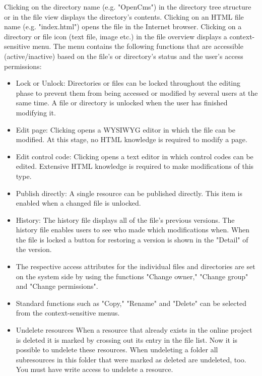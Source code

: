 Clicking on the directory name (e.g. "OpenCms") in the directory
tree structure or in the file view displays the directory's
contents. Clicking on an HTML file name (e.g. "index.html") opens
the file in the Internet browser. Clicking on a directory or file
icon (text file, image etc.) in the file overview displays a
context-sensitive menu. The menu contains the following functions
that are accessible (active/inactive) based on the file's or
directory's status and the user's access permissions:

\begin{itemize}
\item Lock or Unlock: Directories or files can be locked throughout
the editing phase to prevent them from being accessed or modified
by several users at the same time. A file or directory is unlocked
when the user has finished modifying it.

\item Edit page: Clicking opens a WYSIWYG editor in which the file can be modified.
At this stage, no HTML knowledge is required to modify a page.

\item Edit control code: Clicking opens a text editor in which
control codes can be edited. Extensive HTML knowledge is required
to make modifications of this type.

\item Publish directly: A single resource can be published
directly. This item is enabled when a changed file is unlocked.

\item History: The history file displays all of the file's previous
versions. The history file enables users to see who made which
modifications when. When the file is locked a button for restoring
a version is shown in the "Detail" of the version.

\item The respective access
attributes for the individual files and directories are set on the
system side by using the functions "Change owner," "Change group"
and "Change permissions".

\item Standard functions such as "Copy,"
"Rename" and "Delete" can be selected from the context-sensitive
menus.

\item Undelete resources  When a resource
that already exists in the online project is deleted it is marked
by crossing out its entry in the file list. Now it is possible to
undelete these resources. When undeleting a folder all
subresources in this folder that were marked as deleted are
undeleted, too. You must have write access to undelete a resource.


\end{itemize}
